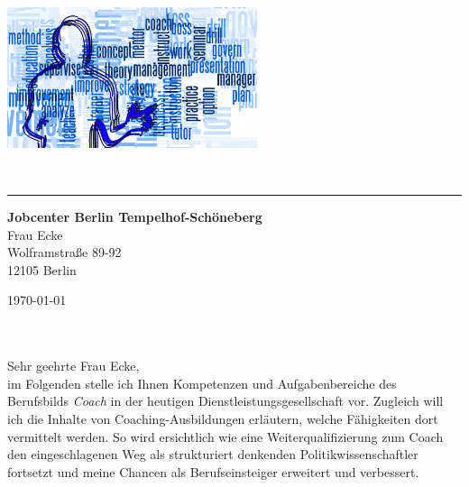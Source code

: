 \documentclass[11pt,a4paper]{article}
\def\firstname{Pascal}
\def\familyname{Bernhard}
\begin{document}
\sffamily   %
\hfill%
\begin{minipage}[t]{.6\textwidth}
\raggedleft%
\includegraphics[width=0.55\textwidth]{Coaching-Logo_1280-720.jpg}


\end{minipage}\\[0.5em]
%
{\color{firstnamecolor}\rule{\textwidth}{.25ex}}
%
\begin{minipage}[t]{.4\textwidth}
	\raggedright%
	\vspace*{1em}
	\textbf{Jobcenter Berlin Tempelhof-Schöneberg} \\
	Frau Ecke \\[.35ex]
	\small%
	Wolframstraße 89-92\\
	12105 Berlin
\end{minipage}
%
\hfill
%
\begin{minipage}[t]{.4\textwidth}
	\raggedleft %
	\today
\end{minipage}\\[2.2em]


{\bfseries \color{familynamecolor}{Weiterqualifizierung zum Systemischen Coach -- Brückenschlag in den Arbeitsmarkt}}\\[0.75em]

Sehr geehrte Frau Ecke,\\[0.2em]
%
im Folgenden stelle ich Ihnen Kompetenzen und Aufgabenbereiche des Berufsbilds \textsl{Coach} in der heutigen Dienstleistungsgesellschaft vor. Zugleich will ich die Inhalte von Coaching-Ausbildungen erläutern, welche Fähigkeiten dort vermittelt werden. So wird ersichtlich wie eine Weiterqualifizierung zum Coach den eingeschlagenen Weg als strukturiert denkenden Politikwissenschaftler fortsetzt und meine Chancen als Berufseinsteiger erweitert und verbessert.
\end{document}
